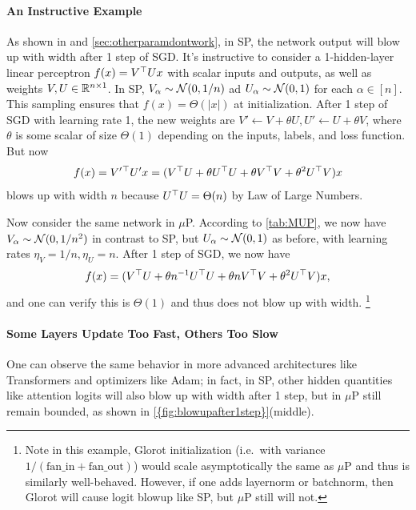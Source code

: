 \documentclass{article}
\theoremstyle{definition}
\newcommand{\fanin}{\mathrm{fan\_in}}
\newcommand{\fanout}{\mathrm{fan\_out}}
\begin{document}
  \paragraph{An Instructive Example}
  As shown in \citep{TP4} and \cref{sec:otherparamdontwork}, in SP, the network output will blow up with width after 1 step of SGD.
  It's instructive to consider a 1-hidden-layer linear perceptron $f(x) = V^\top U x$ with scalar inputs and outputs, as well as weights $V, U \in \mathbb{R}^{n \times 1}$.
  In SP, $V_\alpha \sim \mathcal{N}(0, 1/n)$ ad $U_\alpha \sim \mathcal{N}(0, 1)$ for each $\alpha \in [n]$.
  This sampling ensures that $f(x) = \Theta(|x|)$ at initialization.
  After 1 step of SGD with learning rate 1, the new weights are $V' \gets V + \theta U, U' \gets U + \theta V$, where $\theta$ is some scalar of size $\Theta(1)$ depending on the inputs, labels, and loss function.
  But now
  \begin{equation}
  f(x) = V'{}^\trsp U' x = (V^\trsp U + \theta U^\trsp U + \theta V^\trsp V + \theta^2 U^\trsp V) x
  \label{eqn:lin1lp1step}
  \end{equation}
  blows up with width $n$ because $U^\top U = \Theta(n)$ by Law of Large Numbers.

  Now consider the same network in $\mu$P.
  According to \cref{tab:MUP}, we now have $V_\alpha \sim \mathcal{N}(0, 1/n^2)$ in contrast to SP, but $U_\alpha \sim \mathcal{N}(0, 1)$ as before, with learning rates $\eta_{V} = 1/n, \eta_U = n$.
  After 1 step of SGD, we now have
  \[
    f(x) = (V^\top U + \theta n^{-1} U^\top U + \theta n V^\top V + \theta^2 U^\top V) x,
  \]
  and one can verify this is $\Theta(1)$ and thus does not blow up with width.%
  \footnote{
  Note in this example, Glorot initialization \citep{glorot_understanding_2010} (i.e.\ with variance $1/(\fanin{} + \fanout{})$) would scale asymptotically the same as $\mu$P and thus is similarly well-behaved.
  However, if one adds layernorm or batchnorm, then Glorot will cause logit blowup like SP, but $\mu$P still will not.
  }
  
  \paragraph{Some Layers Update Too Fast, Others Too Slow}
  One can observe the same behavior in more advanced architectures like Transformers and optimizers like Adam;
  in fact, in SP, other hidden quantities like attention logits will also blow up with width after 1 step, but in $\mu$P still remain bounded, as shown in \cref{{fig:blowupafter1step}}(middle).
\end{document}
